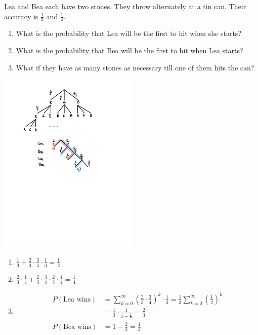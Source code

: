 \documentclass[twoside,11pt,a4paper]{article}
\newif\ifEN \ENtrue	                %
\def\tr|#1|#2|{\ifEN #2\else #1\fi}     %
\theoremstyle{definition}
\newcounter{exc}
\def\answerline#1{%
   \ifhmode\\[1ex]\fcolorbox{solbox}{solbox}{\hbox to \linewidth{\vbox to #1\baselineskip{}}}%
   \else\fcolorbox{solbox}{solbox}{\hbox to \linewidth{\vbox to #1\baselineskip{}}}%
   \fi
 }
\begin{document}
\begin{xxwrap}
\begin{exc}
\tr|Lea und Bea haben je zwei Steine und werfen sie abwechselnd auf eine Blechdose. 
    Ihre Treffgenauigkeit ist jeweils $\frac{1}{3}$ und $\frac{1}{4}$. 
   |Lea and Bea each have two stones. They throw alternately at a tin can. Their accuracy is $\frac{1}{3}$ and $\frac{1}{4}$. |
\begin{enumerate}
\item \tr|Wie gross ist die Wahrscheinlichkeit, dass Lea als erste trifft, wenn sie beginnt?
         |What is the probability that Lea will be the first to hit when she starts?|
\item \tr|Wie gross ist die Wahrscheinlichkeit, dass Bea als erste trifft, wenn Lea beginnt?
         |What is the probability that Bea will be the first to hit when Lea starts?|
\item \tr|Und was ändert sich, wenn beide ihre Steine mehrmals verwenden können?
         |What if they have as many stones as necessary till one of them hits the can?|
\end{enumerate}
\end{exc}
\begin{Answer}
  \begin{center}
\includegraphics[width=0.5\textwidth]{images/probability/SOL_Stones.pdf}
\end{center}
  \begin{enumerate}
  \item $\frac13+\frac23\cdot \frac34\cdot\frac13=\frac12$
  \item $\frac23\cdot\frac14+\frac23\cdot\frac34\cdot\frac23\cdot\frac14=\frac14$
  \item 
    \begin{align*}
      P(\text{Lea \tr|gewinnt|wins|})&= \sum_{k=0}^\infty \left(\frac23\cdot\frac34\right)^k\cdot \frac13
                                       =\frac13\sum_{k=0}^\infty\left(\frac12\right)^k\\
                                     &=\frac13\cdot\frac1{1-\frac12}=\frac23\\
      P(\text{Bea \tr|gewinnt|wins|})&= 1-\frac23=\frac13
    \end{align*}
  \end{enumerate}
\end{Answer}
\answerline{12}
\end{xxwrap}
\end{document}
